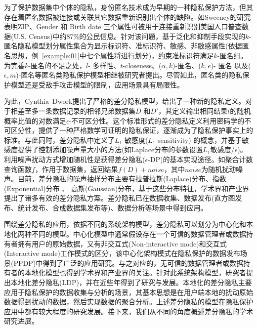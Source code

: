 为了保护数据集中个体的隐私，身份匿名技术成为早期的一种隐私保护方法，但其存在着匿名数据被连接或关联其它数据重新识别出个体的缺陷。如Sweeney\cite{sweeney2002k}的研究表明ZIP、Gender 和 Birth date 三个属性可被用于连接重新识别美国人口普查数据(U.S. Census)中约87\%的公民信息。针对该问题，基于泛化和抑制\cite{sweeney2002achieving}手段实现的$k$-匿名隐私模型划分属性集合为显示标识符、准标识符、敏感、非敏感属性(依据匿名思想，例~\ref{example:01}中七个属性将进行划分)，约束准标识符满足$k$-匿名组。为完善$k$-匿名的不足之处，$l$- 多样性\cite{machanavajjhala2006l}、$t$-closeness\cite{li2007t}、($\alpha,k$)-匿名\cite{wong2006a}、($k,e$)- 匿名\cite{zhang2007aggregate} 以及($\epsilon,m$)-匿名\cite{li2008preservation}等匿名类隐私保护模型相继被研究者提出。尽管如此，匿名类的隐私保护模型还是受敌手攻击模型的限制，应用场景具有局限性。

为此，Cynthia~Dwork\cite{dwork2006differential,dwork2006calibrating,dwork2015the}提出了严格的差分隐私模型，给出了一种新的隐私定义。对于相差至多一条数据记录的相邻兄弟数据集$D$ 和$D'$，其定义输出相同结果$t$的随机概率比值的对数满足$\epsilon$-不可区分性。这个标准形式的差分隐私\cite{dwork2006calibrating}定义利用密码学的不可区分性，提供了一种严格数学可证明的隐私保证，逐渐成为了隐私保护事实上的标准。与此同时，差分隐私中定义了$L_1$ 敏感度($L_1$ sensitivity) 的概念，并基于敏感度提供了控制添加噪声量大小的方法(如Laplace分布的参数设置$L_1$敏感度/$\epsilon$)。利用噪声扰动方式增加随机性是获得差分隐私($\epsilon$-DP)的基本实现途径。如聚合计数查询函数$f$，作用于数据集，返回结果$f(D)+noise$，其中$noise$为随机扰动噪声。目前，差分隐私的噪声抽样分布主要有拉普拉斯(Laplace)分布\cite{dwork2006calibrating}、指数(Exponential)分布
\cite{dwork2008differential}、 高斯(Gaussian)分布\cite{dwork2014algorithmic}，基于这些分布特征，学术界和产业界提出了诸多有效的差分隐私方案。差分隐私已在数据收集、数据发布(直方图发布、统计发布、合成数据集发布等)、数据分析等场景中得到应用。

围绕差分隐私的应用，依据不同的系统架构模型，差分隐私可以划分为中心化和本地化两种不同的模型\cite{dwork2014algorithmic}。中心化模型中通常假设存在一个可信的数据管理者或数据持有者拥有用户的原始数据，又有非交互式(Non-interactive mode)和交互式(Interactive mode)工作模式的区分，该中心化架构模式在隐私保护的数据发布场景(PPDP)中得到了广泛的应用研究\cite{zhangxiaojian2014,zhu2017differentially,zhu2017differential}。与之对应的，无可信的数据管理者或数据持有者的本地化模型也得到学术界和产业界的关注。针对此系统架构模型，研究者提出本地化差分隐私(LDP)\cite{duchi2013local,duchi2013localprivacy}，并在近些年得到了研究与发展。本地化的差分隐私主要应用于隐私保护的数据收集与分析的场景，其基本思想是在用户端本地的扰动原始数据得到扰动的数据，然后实现数据的聚合分析。上述差分隐私的模型在隐私保护应用中都有较大程度的研究发展。接下来，我们从不同的角度概述差分隐私的学术研究进展。

